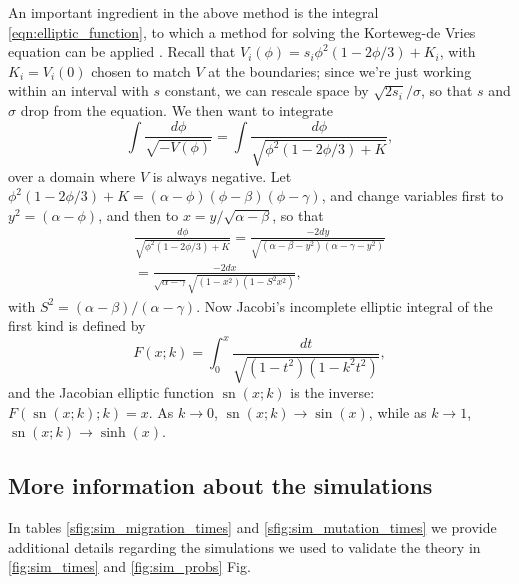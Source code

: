 \documentclass{article}
\newcommand{\citep}[1]{\cite{#1}}
\DeclareMathOperator{\sn}{sn}
\begin{document}
An important ingredient in the above method is the integral \eqref{eqn:elliptic_function},
to which a method for solving the Korteweg-de Vries equation can be applied \citep{NEQwiki}.
Recall that $V_i(\phi) =  s_i \phi^2(1-2\phi/3) + K_i$, with $K_i = V_i(0)$ chosen to match $V$ at the boundaries;
since we're just working within an interval with $s$ constant, we can rescale space by $\sqrt{2 s_i}/\sigma$,
so that $s$ and $\sigma$ drop from the equation.
We then want to integrate
\[
    \int \frac{ d\phi }{ \sqrt{-V(\phi)} } = 
         \int \frac{ d\phi }{ \sqrt{ \phi^2 (1-2\phi/3) + K } } ,
\]
over a domain where $V$ is always negative.
Let $\phi^2(1-2\phi/3)+K = (\alpha-\phi)(\phi-\beta)(\phi-\gamma)$,
and change variables first to $y^2=(\alpha-\phi)$, 
and then to $x = y/\sqrt{\alpha-\beta}$, so that
\begin{align*}
    \frac{ d\phi }{ \sqrt{ \phi^2 (1-2\phi/3) + K } } 
        = \frac{ - 2 dy }{ \sqrt{ (\alpha-\beta-y^2) (\alpha-\gamma-y^2) } } \\
        = \frac{ - 2 dx }{ \sqrt{\alpha-\gamma} \sqrt{ (1-x^2) (1-S^2 x^2) } } ,
\end{align*}
with $S^2 = (\alpha-\beta)/(\alpha-\gamma)$.
Now Jacobi's incomplete elliptic integral of the first kind is defined by
\[
    F(x;k) = \int_0^x \frac{dt}{\sqrt{ (1-t^2)(1-k^2t^2) }} ,
\]
and the Jacobian elliptic function $\sn(x;k)$ is the inverse: $F(\sn(x;k);k) = x$.
As $k \to 0$, $\sn(x;k) \to \sin(x)$, while as $k \to 1$, $\sn(x;k) \to \sinh(x)$.




\subsection*{More information about the simulations}
\label{apx:parameter_tables}

In tables \ref{sfig:sim_migration_times}
and \ref{sfig:sim_mutation_times}
we provide additional details regarding the simulations we used
to validate the theory in \ref{fig:sim_times} and \ref{fig:sim_probs} Fig.
\end{document}
